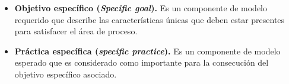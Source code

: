 \begin{itemize}
\item \textbf{\hypertarget{sgoal}{Objetivo específico} (\textit{Specific goal}).} Es un componente de modelo requerido que describe las características únicas que deben estar presentes para satisfacer el área de proceso.
\item \textbf{\hypertarget{spractice}{Práctica específica} (\textit{specific practice}).} Es un componente de modelo esperado que es considerado como importante para la consecución del objetivo específico asociado.

\end{itemize}
